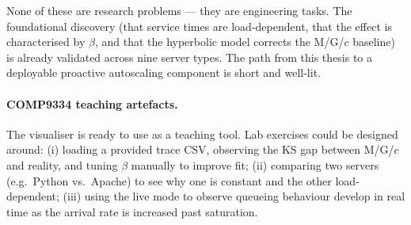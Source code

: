 None of these are research problems — they are engineering tasks. The foundational discovery (that service times are load-dependent, that the effect is characterised by $\beta$, and that the hyperbolic model corrects the M/G/$c$ baseline) is already validated across nine server types. The path from this thesis to a deployable proactive autoscaling component is short and well-lit.

\paragraph{COMP9334 teaching artefacts.}
The visualiser is ready to use as a teaching tool. Lab exercises could be designed around: (i) loading a provided trace CSV, observing the KS gap between M/G/$c$ and reality, and tuning $\beta$ manually to improve fit; (ii) comparing two servers (e.g.\ Python vs.\ Apache) to see why one is constant and the other load-dependent; (iii) using the live mode to observe queueing behaviour develop in real time as the arrival rate is increased past saturation.
